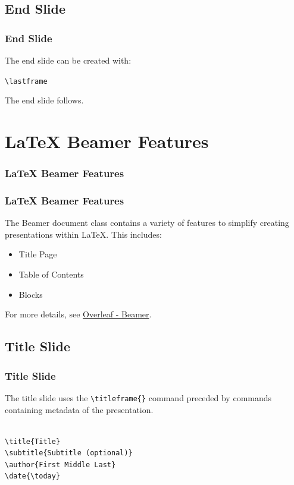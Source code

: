 \documentclass[t]{beamer}
\begin{document}
\subsection{End Slide}
\begin{frame}[fragile=singleslide]
  \frametitle{End Slide}

  The end slide can be created with:
  \vspace{\baselineskip}

  \verb|\lastframe|
  \vspace{\baselineskip}

  The end slide follows.

\end{frame}

\lastframe{}

\section{LaTeX Beamer Features}

\begin{frame}
  \frametitle{LaTeX Beamer Features}
  \tableofcontents[currentsection]
  \vspace{200pt}  %
\end{frame}

\begin{frame}[fragile=singleslide]
  \frametitle{LaTeX Beamer Features}

  The Beamer document class contains a variety of features to simplify creating
  presentations within LaTeX. This includes:

  \begin{itemize}
    \item{Title Page}
    \item{Table of Contents}
    \item{Blocks}
  \end{itemize}

  For more details, see
  \href{https://www.overleaf.com/learn/latex/Beamer}{Overleaf - Beamer}.

\end{frame}

\subsection{Title Slide}
\begin{frame}[fragile=singleslide]
  \frametitle{Title Slide}

  The title slide uses the \verb|\titleframe{}| command preceded by commands
  containing metadata of the presentation.

  \begin{lstlisting}[basicstyle=\footnotesize\ttfamily]

\title{Title}
\subtitle{Subtitle (optional)}
\author{First Middle Last}
\date{\today}

  \end{lstlisting}

\end{frame}
\end{document}

